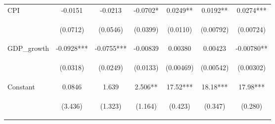 \documentclass[]{article}
\begin{document}
\begin{center}
\begin{tabular}{lcccccc}
CPI & -0.0151 & -0.0213 & -0.0702* & 0.0249** & 0.0192** & 0.0274*** \\
\vspace{4pt} & \begin{footnotesize}(0.0712)\end{footnotesize} & \begin{footnotesize}(0.0546)\end{footnotesize} & \begin{footnotesize}(0.0399)\end{footnotesize} & \begin{footnotesize}(0.0110)\end{footnotesize} & \begin{footnotesize}(0.00792)\end{footnotesize} & \begin{footnotesize}(0.00724)\end{footnotesize} \\
GDP\_growth & -0.0928*** & -0.0755*** & -0.00839 & 0.00380 & 0.00423 & -0.00780** \\
\vspace{4pt} & \begin{footnotesize}(0.0318)\end{footnotesize} & \begin{footnotesize}(0.0249)\end{footnotesize} & \begin{footnotesize}(0.0133)\end{footnotesize} & \begin{footnotesize}(0.00469)\end{footnotesize} & \begin{footnotesize}(0.00542)\end{footnotesize} & \begin{footnotesize}(0.00302)\end{footnotesize} \\
Constant & 0.0846 & 1.639 & 2.506** & 17.52*** & 18.18*** & 17.98*** \\
 & \begin{footnotesize}(3.436)\end{footnotesize} & \begin{footnotesize}(1.323)\end{footnotesize} & \begin{footnotesize}(1.164)\end{footnotesize} & \begin{footnotesize}(0.423)\end{footnotesize} & \begin{footnotesize}(0.347)\end{footnotesize} & \begin{footnotesize}(0.280)\end{footnotesize} \\

\end{tabular}
\end{center}
\end{document}
